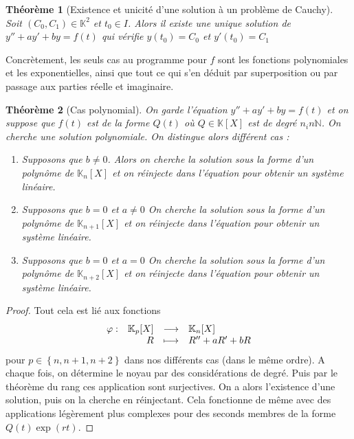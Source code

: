 \documentclass[french]{book}
\newcommand{\N}{\mathbb{N}}
\newcommand{\K}{\mathbb{K}}
\theoremstyle{plain}
\newtheorem{thm}{Théorème}[chapter]
\theoremstyle{definition}
\theoremstyle{remark}
\begin{document}
\begin{thm}[Existence et unicité d'une solution à un problème de Cauchy]
	Soit $(C_0,C_1)\in\K^2$ et $t_0\in I$. Alors il existe une unique solution de $y''+ay'+by=f(t)$ qui vérifie $y(t_0)=C_0$ et $y'(t_0)=C_1$
\end{thm}
Concrètement, les seuls cas au programme pour $f$ sont les fonctions polynomiales et les exponentielles, ainsi que tout ce qui s'en déduit par superposition ou par passage aux parties réelle et imaginaire.
\begin{thm}[Cas polynomial]
	On garde l'équation $y''+ay'+by=f(t)$ et on suppose que $f(t)$ est de la forme $Q(t)$ où $Q\in\K[X]$ est de degré $n_in\N$. On cherche une solution polynomiale. On distingue alors différent cas :
	\begin{enumerate}
		\item Supposons que $b\ne 0$. Alors on cherche la solution sous la forme d'un polynôme de $\K_n[X]$ et on réinjecte dans l'équation pour obtenir un système linéaire.
		\item Supposons que $b=0$ et $a\ne 0$ On cherche la solution sous la forme d'un polynôme de $\K_{n+1}[X]$ et on réinjecte dans l'équation pour obtenir un système linéaire.
		\item Supposons que $b=0$ et $a=0$ On cherche la solution sous la forme d'un polynôme de $\K_{n+2}[X]$ et on réinjecte dans l'équation pour obtenir un système linéaire.
	\end{enumerate}
\end{thm}
\begin{proof}
	Tout cela est lié aux fonctions 
	$$
	\begin{array}[t]{lrcl}
		\varphi: & \K_p[X] & \longrightarrow & \K_n[X] \\
		& R & \longmapsto & R''+aR'+bR
	\end{array}
	$$ pour $p\in\left\{n,n+1,n+2\right\}$ dans nos différents cas (dans le même ordre). A chaque fois, on détermine le noyau par des considérations de degré. Puis par le théorème du rang ces application sont surjectives. On a alors l'existence d'une solution, puis on la cherche en réinjectant. Cela fonctionne de même avec des applications légèrement plus complexes pour des seconds membres de la forme $Q(t)\exp(rt)$.
\end{proof}
\end{document}
